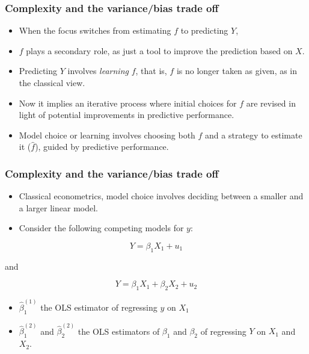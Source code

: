 \documentclass[
  shownotes,
  xcolor={svgnames},
  hyperref={colorlinks,citecolor=DarkBlue,linkcolor=DarkRed,urlcolor=DarkBlue}
  ]{beamer}
\begin{document}
\begin{frame}
\frametitle{Complexity and the variance/bias trade off}

\begin{itemize}

  \item When the focus switches from estimating $f$ to predicting $Y$, 
  \bigskip
  \item $f$ plays a secondary role, as just a tool to improve the prediction based on $X$.
  \bigskip
  \item  Predicting $Y$ involves \emph{learning} $f$, that is, $f$ is no longer taken as given, as in the classical view. 
  \bigskip
  \item Now it implies an iterative process where initial choices for $f$ are revised in light of potential improvements in predictive performance.
  \bigskip
  \item Model choice or learning involves choosing both $f$ and a strategy to estimate it ($\hat f$), guided by predictive performance. 

\end{itemize}


\end{frame}

\begin{frame}
\frametitle{Complexity and the variance/bias trade off}

\begin{itemize}
\item Classical econometrics, model choice involves deciding between a smaller and a larger linear model. 
\item Consider the following competing models for $y$:

\end{itemize}
\bigskip
\begin{equation}
Y=\beta_1 X_1 + u_1
\end{equation}

and

\begin{equation}
Y=\beta_1 X_1 + \beta_2 X_2 + u_2
\end{equation}

\bigskip
\begin{itemize}
  \item $\hat \beta^{(1)}_1$ the OLS estimator of regressing $y$ on $X_1$
  \item  $\hat \beta^{(2)}_1$ and $\hat \beta^{(2)}_2$ the OLS estimators of $\beta_1$ and $\beta_2$ of regressing $Y$ on $X_1$ and $X_2$. 
\end{itemize}
 
\end{frame}
\end{document}
